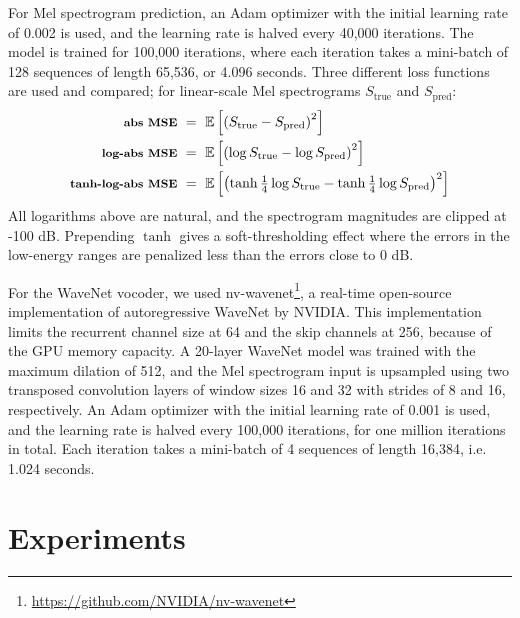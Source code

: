 For Mel spectrogram prediction, an Adam optimizer with the initial learning rate of 0.002 is used, and the learning rate is halved every 40,000 iterations.
The model is trained for 100,000 iterations, where each iteration takes a mini-batch of 128 sequences of length 65,536, or 4.096 seconds.
Three different loss functions are used and compared; for linear-scale Mel spectrograms $S_{\mathrm{true}}$ and $S_{\mathrm{pred}}$:
\begin{align}
\footnotesize \textbf{abs MSE} & ~=~ \mathbb{E} \left [ \left ( S_{\mathrm{true}} - S_{\mathrm{pred}} \right )^2 \right ]
\label{eqn:abs-loss} \\
\footnotesize \textbf{log-abs MSE} & ~=~ \mathbb{E} \left [ \left ( \log S_{\mathrm{true}} - \log S_{\mathrm{pred}} \right )^2 \right ]
\label{eqn:log-abs-loss} \\
\footnotesize \textbf{tanh-log-abs MSE} & ~=~ \mathbb{E} \left [ \left ( \tanh \tfrac{1}{4}\log S_{\mathrm{true}} - \tanh \tfrac{1}{4}\log S_{\mathrm{pred}}  \right )^2 \right ]
\label{eqn:tanh-log-abs-loss}
\end{align}
\noindent All logarithms above are natural, and the spectrogram magnitudes are clipped at -100 dB. Prepending $\tanh$ gives a soft-thresholding effect where the errors in the low-energy ranges are penalized less than the errors close to 0 dB.

For the WaveNet vocoder, we used nv-wavenet\footnote{\url{https://github.com/NVIDIA/nv-wavenet}}, a real-time open-source implementation of autoregressive WaveNet by NVIDIA.
This implementation limits the recurrent channel size at 64 and the skip channels at 256, because of the GPU memory capacity.
A 20-layer WaveNet model was trained with the maximum dilation of 512, and the Mel spectrogram input is upsampled using two transposed convolution layers of window sizes 16 and 32 with strides of 8 and 16, respectively.
An Adam optimizer with the initial learning rate of 0.001 is used, and the learning rate is halved every 100,000 iterations, for one million iterations in total.
Each iteration takes a mini-batch of 4 sequences of length 16,384, i.e. 1.024 seconds.

\section{Experiments}\label{sec:experiments}

